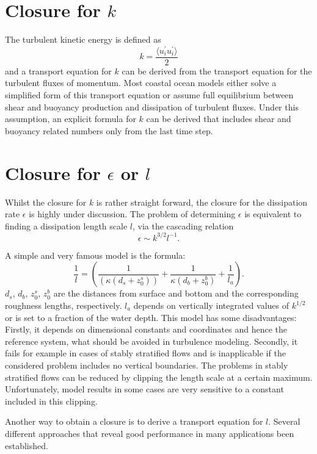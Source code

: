 \section{Closure for $k$ }

The turbulent kinetic energy is defined as
\begin{equation}
 \label{TKE}
 k = \frac{\langle u_i^\prime u_i^\prime \rangle}{2}
\end{equation}
and a transport equation for $k$ can be derived from the transport equation for the turbulent fluxes of momentum. Most coastal ocean models either solve a simplified form of this transport equation or assume full equilibrium between shear and buoyancy production and dissipation of turbulent fluxes. Under this assumption, an explicit formula for $k$ can be derived that includes shear and buoyancy related numbers only from the last time step. 

\section{Closure for $\epsilon$ or $l$ }

Whilst the closure for $k$ is rather straight forward, the closure for the dissipation rate $\epsilon$ is highly under discussion. The problem of determining $\epsilon$ is equivalent to finding a dissipation length scale $l$, via the cascading relation \citep[][]{UmlaufBurchard2005a}
\begin{equation}
 \label{cascad}
 \epsilon \sim k^{3 \slash 2} l^{-1}.
\end{equation}

A simple and very famous model is the \cite{blackadar1962} formula:
\begin{equation}
 \label{blackadar}
 \frac{1}{l} = \left( \frac{1}{(\kappa (d_s + z_0^s) )} + \frac{1}{\kappa (d_b + z_0^b)} + \frac{1}{l_a} \right).
\end{equation}
$d_s,\, d_b,\, z_0^s,\, z_0^b$ are the distances from surface and bottom and the corresponding roughness lengths, respectively. $l_a$ depends on vertically integrated values of $k^{1 \slash 2}$ or is set to a fraction of the water depth. This model has some disadvantages: Firstly, it depends on dimensional constants and coordinates and hence the reference system, what should be avoided in turbulence modeling. Secondly, it fails for example in cases of stably stratified flows and is inapplicable if the considered problem includes no vertical boundaries. The problems in stably stratified flows can be reduced by clipping the length scale at a certain maximum. Unfortunately, model results in some cases are very sensitive to a constant included in this clipping.

Another way to obtain a closure is to derive a transport equation for $l$. Several different approaches that reveal good performance in many applications been established.




